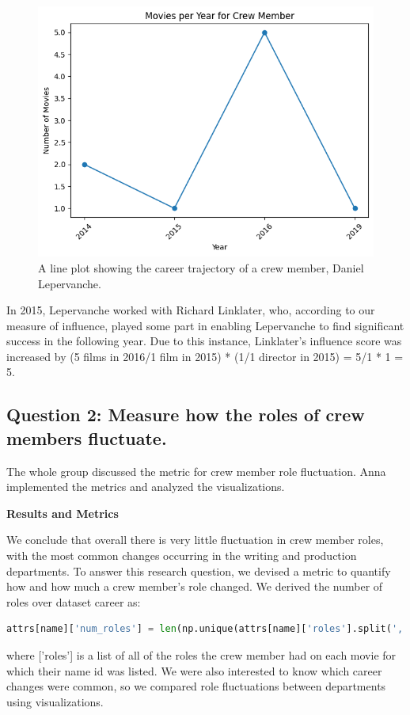 \documentclass[12pt]{article}
\begin{document}
\begin{figure}[h!]
    \centering
    \includegraphics[width=0.5\linewidth]{1_career_traj.png}
    \caption{A line plot showing the career trajectory of a crew member, Daniel Lepervanche.}
    \label{fig:career_traj}
\end{figure}

In 2015, Lepervanche worked with Richard Linklater, who, according to our measure of influence, played some part in enabling Lepervanche to find significant success in the following year. Due to this instance, Linklater's influence score was increased by (5 films in 2016/1 film in 2015) * (1/1 director in 2015) = 5/1 * 1 = 5.

\subsection*{Question 2: Measure how the roles of crew members fluctuate.}

\noindent The whole group discussed the metric for crew member role fluctuation. Anna implemented the metrics and analyzed the visualizations.

\textbf{Results and Metrics}

We conclude that overall there is very little fluctuation in crew member roles, with the most common changes occurring in the writing and production departments. To answer this research question, we devised a metric to quantify how and how much a crew member's role changed. We derived the number of roles over dataset career as:

\begin{lstlisting}[language=Python,label=lst:copy]
attrs[name]['num_roles'] = len(np.unique(attrs[name]['roles'].split(', ')))

\end{lstlisting}
where ['roles'] is a list of all of the roles the crew member had on each movie for which their name id was listed. We were also interested to know which career changes were common, so we compared role fluctuations between departments using visualizations.
\end{document}
